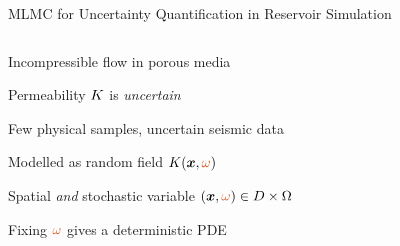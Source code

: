 \def\name{MLMC for Uncertainty Quantification in Reservoir Simulation}

\begin{frame}{\name{}}
    \setlength{\cw}{0.6\textwidth}%
    \begin{overlayarea}{\textwidth}{\frameheight}
        \vspace{2em}
        \begin{columns}
            \begin{column}{\cw}
                \begin{squarelist}
                    \item<1-> Incompressible flow in porous media 
                    \item<3-> Permeability $K$ is \emph{uncertain}
                    \begin{vertlist}
                        \item Few physical samples, uncertain seismic data
                    \end{vertlist}
                    \item<4-> Modelled as random field $K(\vx, \redtext{\omega})$
                    \begin{vertlist}
                        \item Spatial \emph{and} stochastic variable $(\vx, \redtext{\omega}) \in \spa \times \Omega$
                    \end{vertlist}
                    \item<5-> Fixing $\redtext{\omega}$ gives a deterministic PDE

\end{squarelist}
\end{column}
\end{columns}
\end{overlayarea}
\end{frame}
